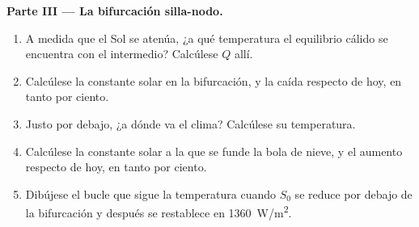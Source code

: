 \begin{problem}
\medskip\noindent\textbf{Parte III --- La bifurcación silla-nodo.}
\begin{enumerate}[resume]
\item A medida que el Sol se atenúa, ¿a qué temperatura el equilibrio cálido
  se encuentra con el intermedio? Calcúlese $Q$ allí.
\item Calcúlese la constante solar en la bifurcación, y la caída
  respecto de hoy, en tanto por ciento.
\item Justo por debajo, ¿a dónde va el clima? Calcúlese su temperatura.
\item Calcúlese la constante solar a la que se funde la bola de nieve, y el aumento
  respecto de hoy, en tanto por ciento.
\item Dibújese el bucle que sigue la temperatura cuando $S_0$ se reduce
  por debajo de la bifurcación y después se restablece en \qty{1360}{W/m^2}.
\end{enumerate}


\end{problem}
